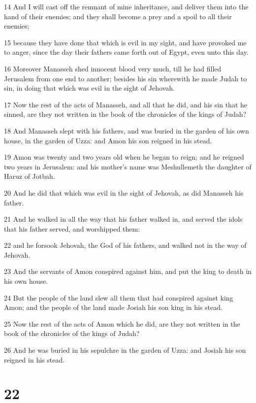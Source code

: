 \par 14 And I will cast off the remnant of mine inheritance, and deliver them into the hand of their enemies; and they shall become a prey and a spoil to all their enemies;
\par 15 because they have done that which is evil in my sight, and have provoked me to anger, since the day their fathers came forth out of Egypt, even unto this day.
\par 16 Moreover Manasseh shed innocent blood very much, till he had filled Jerusalem from one end to another; besides his sin wherewith he made Judah to sin, in doing that which was evil in the sight of Jehovah.
\par 17 Now the rest of the acts of Manasseh, and all that he did, and his sin that he sinned, are they not written in the book of the chronicles of the kings of Judah?
\par 18 And Manasseh slept with his fathers, and was buried in the garden of his own house, in the garden of Uzza: and Amon his son reigned in his stead.
\par 19 Amon was twenty and two years old when he began to reign; and he reigned two years in Jerusalem: and his mother's name was Meshullemeth the daughter of Haruz of Jotbah.
\par 20 And he did that which was evil in the sight of Jehovah, as did Manasseh his father.
\par 21 And he walked in all the way that his father walked in, and served the idols that his father served, and worshipped them:
\par 22 and he forsook Jehovah, the God of his fathers, and walked not in the way of Jehovah.
\par 23 And the servants of Amon conspired against him, and put the king to death in his own house.
\par 24 But the people of the land slew all them that had conspired against king Amon; and the people of the land made Josiah his son king in his stead.
\par 25 Now the rest of the acts of Amon which he did, are they not written in the book of the chronicles of the kings of Judah?
\par 26 And he was buried in his sepulchre in the garden of Uzza: and Josiah his son reigned in his stead.

\chapter{22}

